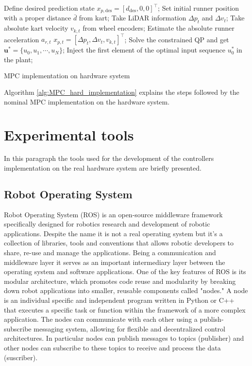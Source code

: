 \documentclass[a4paper,12pt,oneside]{book}
\begin{document}
\begin{algorithm}
\begin{algorithmic}[1]
	\State Define desired prediction state $x_{p,\text{des}} = [d_{\text{des}}, 0, 0]^\top$;
	\State Set initial runner position with a proper distance $\bar{d}$ from kart;
		\State Take LiDAR information $\Delta p_t$ and $\Delta v_t$;
		\State Take absolute kart velocity $v_{k,t}$ from wheel encoders;
 		\State Estimate the absolute runner acceleration $a_{r,t}$
		\State $x_{p,t} = [\Delta p_t, \Delta v_t, v_{k,t}]^\top$;
		\State Solve the constrained QP and get $\boldsymbol{u}^* = \{u_0, u_1, \cdots, u_N\}$; 
		\State Inject the first element of the optimal input sequence $u_0^*$ in the plant;
	\EndFor
\caption{MPC implementation on hardware system}
\label{alg:MPC_hard_implementation}
\end{algorithmic}
\end{algorithm}

Algorithm \ref{alg:MPC_hard_implementation} explains the steps followed by the nominal MPC implementation on the hardware system.

\section{Experimental tools}
In this paragraph the tools used for the development of the controllers implementation on the real hardware system are briefly presented.

\subsection*{Robot Operating System}
Robot Operating System (ROS) is an open-source middleware framework specifically designed for robotics research and development  \cite{ros} of robotic applications. 
Despite the name it is not a real operating system but it's a collection of libraries, tools and conventions that allows robotic developers to share, re-use and manage the applications.
Being a communication and middleware layer it serves as an important intermediary layer between the operating system and software applications.
One of the key features of ROS is its modular architecture, which promotes code reuse and modularity by breaking down robot applications into smaller, reusable components called "nodes." 
A node is an individual specific and independent program written in Python or C++ that executes a specific task or function within the framework of a more complex application.
The nodes can communicate with each other using a publish-subscribe messaging system, allowing for flexible and decentralized control architectures. 
In particular nodes can publish messages to topics (publisher) and other nodes can subscribe to these topics to receive and process the data (suscriber).
\end{document}
